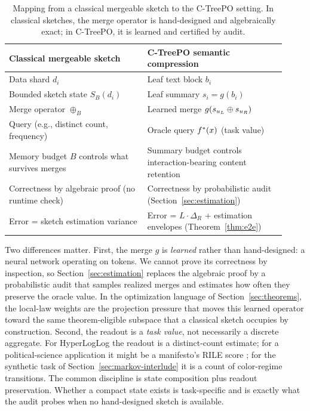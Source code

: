\begin{table}[t]
    \centering
    \small
    \begin{tabular}{p{0.46\linewidth}p{0.46\linewidth}}
        \toprule
        Classical mergeable sketch & C-TreePO semantic compression \\
        \midrule
        Data shard $d_i$ & Leaf text block $b_i$ \\
        Bounded sketch state $S_B(d_i)$ & Leaf summary $s_i = g(b_i)$ \\
        Merge operator $\oplus_B$ & Learned merge $g(s_{u_L}\oplus s_{u_R})$ \\
        Query (e.g., distinct count, frequency) & Oracle query $f^\ast(x)$ (task value) \\
        Memory budget $B$ controls what survives merges & Summary budget controls interaction-bearing content retention \\
        Correctness by algebraic proof (no runtime check) & Correctness by probabilistic audit (Section~\ref{sec:estimation}) \\
        Error = sketch estimation variance & Error = $L \cdot \Delta_R$ + estimation envelopes (Theorem~\ref{thm:e2e}) \\
        \bottomrule
    \end{tabular}
    \caption{Mapping from a classical mergeable sketch to the C-TreePO setting. In classical sketches, the merge operator is hand-designed and algebraically exact; in C-TreePO, it is learned and certified by audit.}
    \label{tab:sketch-mapping}
\end{table}

Two differences matter. First, the merge $g$ is \emph{learned} rather than
hand-designed: a neural network operating on tokens. We cannot prove its
correctness by inspection, so Section~\ref{sec:estimation} replaces the
algebraic proof by a probabilistic audit that samples realized merges and
estimates how often they preserve the oracle value. In the optimization
language of Section~\ref{sec:theorems}, the local-law weights are the
projection pressure that moves this learned operator toward the same
theorem-eligible subspace that a classical sketch occupies by construction.
Second, the readout is a \emph{task value}, not necessarily a discrete
aggregate. For HyperLogLog the readout is a distinct-count estimate; for a
political-science application it might be a manifesto's RILE score
\citep{BenoitEtAl2025,ManifestoProject2025a}; for the synthetic task of
Section~\ref{sec:markov-interlude} it is a count of color-regime transitions.
The common discipline is state composition plus readout preservation. Whether
a compact state exists is task-specific and is exactly what the audit probes
when no hand-designed sketch is available.

